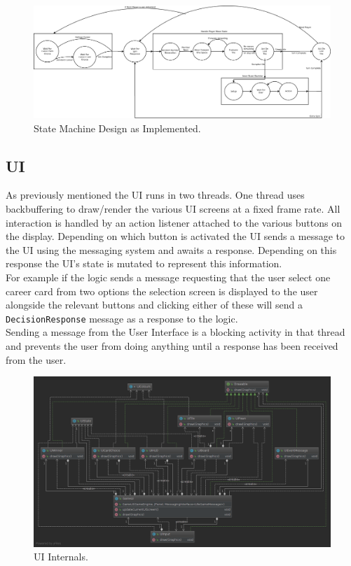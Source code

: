 \documentclass[a4paper, 11pt]{article}
\begin{document}
	\begin{figure}[H]
		\centering
		\includegraphics[scale=.1]{state_machine_high_level}
		\caption{State Machine Design as Implemented.}
		\label{fig:state_machine_actual}
	\end{figure}
	\subsection*{UI}
	As previously mentioned the UI runs in two threads. One thread uses backbuffering to draw/render the various UI screens at a fixed frame rate. All interaction is handled by an action listener attached to the various buttons on the display. Depending on which button is activated the UI sends a message to the UI using the messaging system and awaits a response. Depending on this response the UI's state is mutated to represent this information.\\	
	For example if the logic sends a message requesting that the user select one career card from two options the selection screen is displayed to the user alongside the relevant buttons and clicking either of these will send a \texttt{DecisionResponse} message as a response to the logic.\\	
	Sending a message from the User Interface is a blocking activity in that thread and prevents the user from doing anything until a response has been received from the user.
	\begin{figure}[H]
		\centering
		\includegraphics[scale=.35]{uml/ui_uml}
		\caption{UI Internals.}
		\label{fig:ui_uml}
	\end{figure}
	
\end{document}
